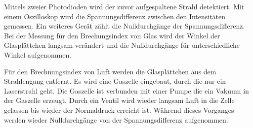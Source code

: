 Mittels zweier Photodioden wird der zuvor aufgespaltene Strahl detektiert.
Mit einem Oszilloskop wird die Spannungsdifferenz zwischen den Intensitäten
gemessen. Ein weiteres Gerät zählt die Nulldurchgänge der Spannungsdifferenz.
Bei der Messung für den Brechungsindex von Glas wird
der Winkel der Glasplättchen langsam verändert und die Nulldurchgänge für unterschiedliche
Winkel aufgenommen.

Für den Brechnungsindex von Luft werden die Glasplättchen
aus dem Strahlengang entfernt. Es wird eine Gaszelle eingebaut, durch
die nur ein Laserstrahl geht. Die Gaszelle ist verbunden mit einer Pumpe
die ein Vakuum in der Gaszelle erzeugt. Durch ein Ventil wird wieder langsam
Luft in die Zelle gelassen bis wieder der Normaldruck erreicht ist. Während
dieses Vorganges werden wieder Nulldurchgänge von der Spannungsdifferenz aufgenommen.
